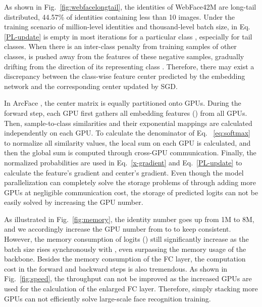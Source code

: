 \documentclass[10pt,twocolumn,letterpaper]{article}
\begin{document}
 As shown in Fig.~\ref{fig:webfacelongtail}, the identities of WebFace42M \cite{zhu2021webface260m} are long-tail distributed, 44.57\% of identities containing less than 10 images. Under the training scenario of million-level identities and thousand-level batch size,  in Eq. \ref{PL-update} is empty in most iterations for a particular class , especially for tail classes. When there is an inter-class penalty from training samples of other classes,  is pushed away from the features of these negative samples, gradually drifting from the direction of its representing class \cite{du2020semi}. Therefore, there may exist a discrepancy between the class-wise feature center predicted by the embedding network and the corresponding center updated by SGD. 

 In ArcFace \cite{deng2019arcface}, the center matrix  is equally partitioned onto  GPUs.
During the forward step, each GPU first gathers all embedding features (\ie ) from all GPUs.
Then, sample-to-class similarities and their exponential mappings are calculated independently on each GPU. 
To calculate the denominator of Eq. ~\ref{eq:softmax} to normalize all similarity values, the local sum on each GPU is calculated, and then the global sum is computed through cross-GPU communication.
Finally, the normalized probabilities are used in Eq.~\ref{x-gradient} and Eq.~\ref{PL-update} to calculate the feature's gradient and center's gradient.
Even though the model parallelization can completely solve the storage problems of  through adding more GPUs at negligible communication cost, the storage of predicted logits can not be easily solved by increasing the GPU number.

As illustrated in Fig.~\ref{fig:memory}, the identity number  goes up from 1M to 8M, and we accordingly increase the GPU number  from  to  to keep  consistent. However, the memory consumption of logits () still significantly increase as the batch size rises synchronously with , even surpassing the memory usage of the backbone. Besides the memory consumption of the FC layer, the computation cost in the forward and backward steps is also tremendous. As shown in Fig.~\ref{fig:speed}, the throughput can not be improved as the increased GPUs are used for the calculation of the enlarged FC layer. Therefore, simply stacking more GPUs can not efficiently solve large-scale face recognition training.
\end{document}

